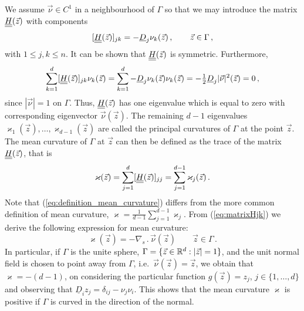 We assume $\vec{\nu} \in C^1$ in a neighbourhood of $\Gamma$ so that we
may introduce the matrix $\mat H(\vec z)$ with components
\begin{equation}\label{eq:matrixHjk}
[\mat H (\vec z)]_{jk} = - \underline{D}_j \nu_k (\vec z)\,, \qquad \vec z \in
\Gamma \, ,
\end{equation}
with $1\leq j,k\leq n$. It can be shown that $\mat H(\vec z)$ is symmetric.
Furthermore,
\begin{equation}
\sum_{k = 1}^{d} [\mat H(\vec z)]_{jk} \nu_k (\vec z) =
\sum_{k = 1}^{d} - \underline{D}_j \nu_k (\vec z) \nu_k (\vec z) =
- \tfrac{1}{2} \underline{D}_j |\vec{\nu}|^2 (\vec z) = 0 \, ,
\end{equation}
since $|\vec{\nu}| = 1$ on $\Gamma$. Thus, $\mat H(\vec z)$ has one
eigenvalue which is equal to zero with corresponding eigenvector
$\vec\nu(\vec z)$. The remaining $d - 1$ eigenvalues $\varkappa_1 (\vec z),
\hdots, \varkappa_{d - 1} (\vec z)$ are called the principal curvatures of
$\Gamma$ at the point $\vec z$. The mean curvature of $\Gamma$ at $\vec z$
can then be defined as the trace of the matrix $\mat H(\vec z)$, that is
\begin{equation}\label{eq:definition_mean_curvature}
\varkappa (\vec z) = \sum_{j = 1}^{d} [\mat H(\vec z)]_{jj} = \sum_{j = 1}^{d -
1} \varkappa_j (\vec z) \,.
\end{equation}
Note that (\ref{eq:definition_mean_curvature}) differs from the more common
definition of mean curvature,
$\varkappa = \frac{1}{d - 1} \sum_{j = 1}^{d - 1} \varkappa_j$.
From (\ref{eq:matrixHjk}) we derive the following expression for mean
curvature:
\begin{equation}
\varkappa (\vec z)=-\nabla_s \,.\, \vec{\nu}(\vec z) \qquad \vec z \in \Gamma\,.
\end{equation}
In particular, if $\Gamma$ is the unite sphere,
$\Gamma = \{ \vec z \in {\mathbb R}^d : |\vec z| = 1 \}$,
and the unit normal field is chosen to point away from $\Gamma$,
i.e.~$\vec\nu(\vec z) = \vec z$, we obtain that $\varkappa = -
(d - 1)$, on considering the particular function $g(\vec z) = z_j$, $j \in \{
1, \hdots, d \}$ and observing that $\underline{D}_i z_j = \delta_{ij} - \nu_j
\nu_i$. This shows that the mean curvature $\varkappa$ is positive if $\Gamma$
is curved in the direction of the normal.

